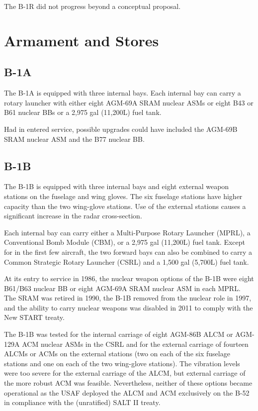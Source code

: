 The B-1R did not progress beyond a conceptual proposal.

\section{Armament and Stores}

\subsection{B-1A}

The B-1A is equipped with three internal bays. Each internal bay can carry a rotary launcher with either eight AGM-69A SRAM nuclear ASMs or eight B43 or B61 nuclear BBs or a 2,975 gal (11,200L) fuel tank.

Had in entered service, possible upgrades could have included the AGM-69B SRAM nuclear ASM and the B77 nuclear BB.

\subsection{B-1B}

The B-1B is equipped with three internal bays and eight external weapon stations on the fuselage and wing gloves. The six fuselage stations have higher capacity than the two wing-glove stations. Use of the external stations causes a significant increase in the radar cross-section.

Each internal bay can carry either a Multi-Purpose Rotary Launcher (MPRL), a Conventional Bomb Module (CBM), or a 2,975 gal (11,200L) fuel tank. Except for in the first few aircraft, the two forward bays can also be combined to carry a Common Strategic Rotary Launcher (CSRL) and a 1,500 gal (5,700L) fuel tank.

At its entry to service in 1986, the nuclear weapon options of the B-1B were eight B61/B63 nuclear BB or eight AGM-69A SRAM nuclear ASM in each MPRL. The SRAM was retired in 1990, the B-1B removed from the nuclear role in 1997, and the ability to carry nuclear weapons was disabled in 2011 to comply with the New START treaty.

The B-1B was tested for the internal carriage of eight AGM-86B ALCM or AGM-129A ACM nuclear ASMs in the CSRL and for the external carriage of fourteen ALCMs or ACMs on the external stations (two on each of the six fuselage stations and one on each of the two wing-glove stations). The vibration levels were too severe for the external carriage of the ALCM, but external carriage of the more robust ACM was feasible. Nevertheless, neither of these options became operational as the USAF deployed the ALCM and ACM exclusively on the B-52 in compliance with the (unratified) SALT II treaty.

